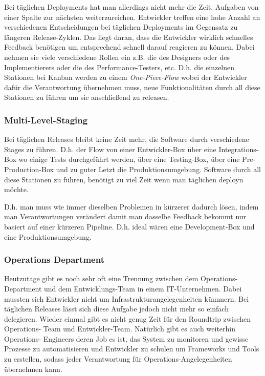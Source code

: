 Bei täglichen Deployments hat man allerdings nicht mehr die Zeit, Aufgaben von
einer Spalte zur nächsten weiterzureichen. Entwickler treffen eine hohe Anzahl
an verschiedenen Entscheidungen bei täglichen Deployments im Gegensatz zu
längeren Release-Zyklen. Das liegt daran, dass die Entwickler wirklich
schnelles Feedback benötigen um entsprechend schnell darauf reagieren zu
können. Dabei nehmen sie viele verschiedene Rollen ein z.B. die des Designers
oder des Implementierers oder die des Performance-Testers, etc. D.h. die
einzelnen Stationen bei Kanban werden zu einem \emph{One-Piece-Flow} wobei der
Entwickler dafür die Verantwortung übernehmen muss, neue Funktionalitäten
durch all diese Stationen zu führen um sie anschließend zu releasen.

\subsubsection{Multi-Level-Staging}
Bei täglichen Releases bleibt keine Zeit mehr, die Software durch verschiedene
Stages zu führen. D.h. der Flow von einer Entwickler-Box über eine
Integrations-Box wo einige Tests durchgeführt werden, über eine Testing-Box,
über eine Pre-Production-Box und zu guter Letzt die Produktionsumgebung.
Software durch all diese Stationen zu führen, benötigt zu viel Zeit wenn man
täglichen deployn möchte.

D.h. man muss wie immer dieselben Problemen in kürzerer dadurch lösen, indem
man Verantwortungen verändert damit man dasselbe Feedback bekommt nur basiert
auf einer kürzeren Pipeline. D.h. ideal wären eine Development-Box und eine
Produktionsumgebung.

\subsubsection{Operations Department}
Heutzutage gibt es noch sehr oft eine Trennung zwischen dem Operations-
Department und dem Entwicklungs-Team in einem IT-Unternehmen. Dabei mussten
sich Entwickler nicht um Infrastrukturangelegenheiten kümmern. Bei täglichen
Releases lässt sich diese Aufgabe jedoch nicht mehr so einfach delegieren.
Wieder einmal gibt es nicht genug Zeit für den Roundtrip zwischen Operations-
Team und Entwickler-Team. Natürlich gibt es auch weiterhin Operations-
Engineers deren Job es ist, das System zu monitoren und gewisse Prozesse zu
automatisieren und Entwickler zu schulen um Frameworks und Tools zu erstellen,
sodass jeder Verantwortung für Operations-Angelegenheiten übernehmen kann.

